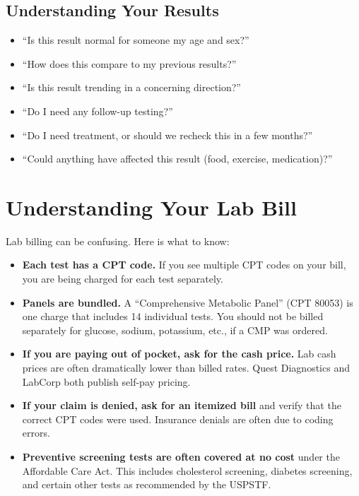 \subsection{Understanding Your Results}

\begin{itemize}
    \item ``Is this result normal for someone my age and sex?''
    \item ``How does this compare to my previous results?''
    \item ``Is this result trending in a concerning direction?''
    \item ``Do I need any follow-up testing?''
    \item ``Do I need treatment, or should we recheck this in a few months?''
    \item ``Could anything have affected this result (food, exercise, medication)?''
\end{itemize}

\clearpage
\section{Understanding Your Lab Bill}

Lab billing can be confusing. Here is what to know:

\begin{itemize}
    \item \textbf{Each test has a CPT code.} If you see multiple CPT codes on your bill, you are being charged for each test separately.
    \item \textbf{Panels are bundled.} A ``Comprehensive Metabolic Panel'' (CPT 80053) is one charge that includes 14 individual tests. You should not be billed separately for glucose, sodium, potassium, etc., if a CMP was ordered.
    \item \textbf{If you are paying out of pocket, ask for the cash price.} Lab cash prices are often dramatically lower than billed rates. Quest Diagnostics and LabCorp both publish self-pay pricing.
    \item \textbf{If your claim is denied, ask for an itemized bill} and verify that the correct CPT codes were used. Insurance denials are often due to coding errors.
    \item \textbf{Preventive screening tests are often covered at no cost} under the Affordable Care Act. This includes cholesterol screening, diabetes screening, and certain other tests as recommended by the USPSTF.
\end{itemize}
